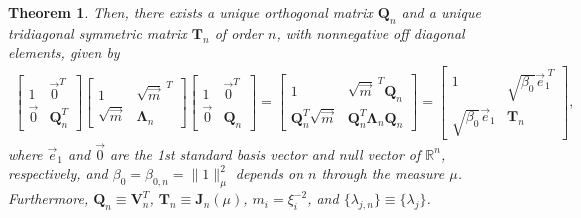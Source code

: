 \documentclass[english,12pt]{ttuthes}
\newtheorem{theorem}{Theorem}[chapter]
\begin{document}
\begin{theorem}
Then, there exists a unique orthogonal matrix $\mathbf{Q}_n$ and
a unique tridiagonal symmetric matrix $\mathbf{T}_n$ of order $n$, with
nonnegative off diagonal elements, given by
%
\begin{align}\label{eq:Spectral_Decomp_Jn}
  \left[
  \begin{matrix}
    1           &\vec{0}^{T}\\
    \vec{0}  &\mathbf{Q}_n^T
  \end{matrix}
  \right]
%
  \left[
  \begin{matrix}
    1                  &\sqrt{\vec{m}}^{\;T}\\
    \sqrt{\vec{m}}  &\mathbf{\Lambda}_n
  \end{matrix}
  \right]
%
  \left[
  \begin{matrix}
    1           &\vec{0}^{T}\\
    \vec{0}  &\mathbf{Q}_n
  \end{matrix}
  \right]
%  
  =
%
  \left[
  \begin{matrix}
    1           &\sqrt{\vec{m}}^{\;T}\mathbf{Q}_n\\
    \mathbf{Q}_n^T\sqrt{\vec{m}}  &\mathbf{Q}_n^T\mathbf{\Lambda}_n\mathbf{Q}_n
  \end{matrix}
  \right]
  =
%
  \left[
  \begin{matrix}
    1           &\sqrt{\beta_0}\vec{e}_1^{\;T}\\
    \sqrt{\beta_0}\vec{e}_1  & \mathbf{T}_n
  \end{matrix}
  \right],  
\end{align}
%
where $\vec{e}_1$ and $\vec{0}$ are the 1st standard basis vector
and null vector of $\mathbb{R}^n$, respectively, and $\beta_0=\beta_{0,n}=\|1\|_\mu^2$
depends on $n$ through the measure $\mu$. Furthermore,
$\mathbf{Q}_n\equiv\mathbf{V}_n^T$, $\mathbf{T}_n\equiv\mathbf{J}_n(\mu)$,
$m_i=\xi_i^{-2}$, and $\{\lambda_{j,n}\}\equiv\{\lambda_j\}$. 
%
\end{theorem}
\end{document}
